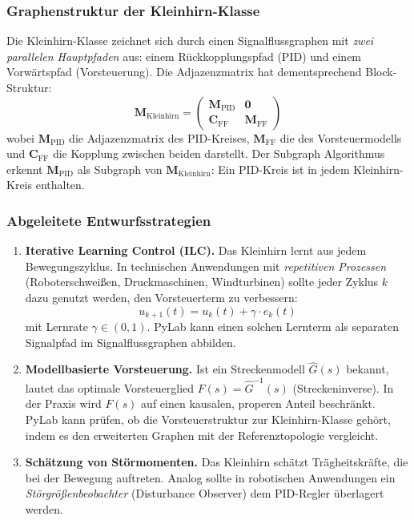 \documentclass[a4paper,12pt]{article}
\theoremstyle{definition}
\begin{document}
\subsubsection{Graphenstruktur der Kleinhirn-Klasse}

Die Kleinhirn-Klasse zeichnet sich durch einen Signalflussgraphen mit
\emph{zwei parallelen Hauptpfaden} aus: einem Rückkopplungspfad (PID) und
einem Vorwärtspfad (Vorsteuerung). Die Adjazenzmatrix hat dementsprechend
Block-Struktur:
\[
\mathbf{M}_{\text{Kleinhirn}} =
\begin{pmatrix}
	\mathbf{M}_{\text{PID}} & \mathbf{0} \\
	\mathbf{C}_{\text{FF}}  & \mathbf{M}_{\text{FF}}
\end{pmatrix}
\]
wobei $\mathbf{M}_{\text{PID}}$ die Adjazenzmatrix des PID-Kreises,
$\mathbf{M}_{\text{FF}}$ die des Vorsteuermodells und
$\mathbf{C}_{\text{FF}}$ die Kopplung zwischen beiden darstellt.
Der Subgraph Algorithmus erkennt $\mathbf{M}_{\text{PID}}$ als Subgraph
von $\mathbf{M}_{\text{Kleinhirn}}$: Ein PID-Kreis ist in jedem Kleinhirn-
Kreis enthalten.

\subsubsection{Abgeleitete Entwurfsstrategien}

\begin{enumerate}
	\item \textbf{Iterative Learning Control (ILC).}
	Das Kleinhirn lernt aus jedem Bewegungszyklus. In technischen
	Anwendungen mit \emph{repetitiven Prozessen} (Roboterschweißen,
	Druckmaschinen, Windturbinen) sollte jeder Zyklus $k$ dazu genutzt
	werden, den Vorsteuerterm zu verbessern:
	\[
	u_{k+1}(t) = u_k(t) + \gamma \cdot e_k(t)
	\]
	mit Lernrate $\gamma \in (0, 1)$. PyLab kann einen solchen Lernterm
	als separaten Signalpfad im Signalflussgraphen abbilden.
	
	\item \textbf{Modellbasierte Vorsteuerung.}
	Ist ein Streckenmodell $\hat{G}(s)$ bekannt, lautet das optimale
	Vorsteuerglied $F(s) = \hat{G}^{-1}(s)$ (Streckeninverse). In der
	Praxis wird $F(s)$ auf einen kausalen, properen Anteil beschränkt.
	PyLab kann prüfen, ob die Vorsteuerstruktur zur Kleinhirn-Klasse
	gehört, indem es den erweiterten Graphen mit der
	Referenztopologie vergleicht.
	
	\item \textbf{Schätzung von Störmomenten.}
	Das Kleinhirn schätzt Trägheitskräfte, die bei der Bewegung auftreten.
	Analog sollte in robotischen Anwendungen ein
	\emph{Störgrößenbeobach\-ter} (Disturbance Observer) dem PID-Regler
	überlagert werden.
\end{enumerate}
\end{document}
